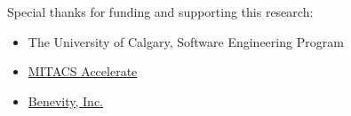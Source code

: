 
Special thanks for funding and supporting this research:

\begin{itemize}
    \item The University of Calgary, Software Engineering Program
	\item \href{https://www.mitacs.ca/en/programs/accelerate}{MITACS Accelerate}
    \item \href{https://benevity.com/}{Benevity, Inc.}
\end{itemize}

